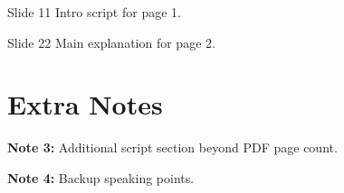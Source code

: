 \begin{SlideScriptBlock}{Slide 1}{1}
Intro script for page 1.
\end{SlideScriptBlock}

\begin{SlideScriptBlock}{Slide 2}{2}
Main explanation for page 2.
\end{SlideScriptBlock}

\section*{Extra Notes}
\textbf{Note 3:} Additional script section beyond PDF page count.

\textbf{Note 4:} Backup speaking points.
